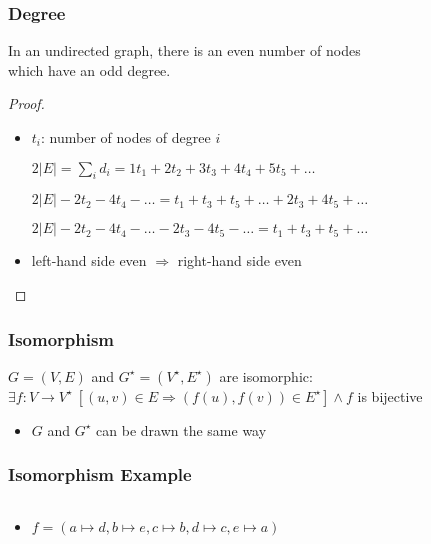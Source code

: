 \documentclass[dvipsnames]{beamer}
\begin{document}
\begin{frame}
  \frametitle{Degree}

  \begin{theorem}
    In an undirected graph, there is an even number of nodes\\
    which have an odd degree.
  \end{theorem}

  \pause
  \begin{proof}
    \begin{itemize}
      \item $t_i$: number of nodes of degree $i$

      \pause
$2|E| = \sum_i d_i = 1t_1 + 2t_2 + 3t_3 + 4t_4 + 5t_5 + \dots$

\pause
$2|E| - 2t_2 - 4t_4 - \dots = t_1 + t_3 + t_5 + \dots + 2t_3 + 4t_5 + \dots$

\pause
$2|E| - 2t_2 - 4t_4 - \dots - 2t_3 - 4t_5 - \dots = t_1 + t_3 + t_5 + \dots$

      \pause
      \item left-hand side even $\Rightarrow$ right-hand side even
    \end{itemize}
  \end{proof}
\end{frame}

\begin{frame}
  \frametitle{Isomorphism}

  \begin{definition}
    $G=(V,E)$ and $G^\star=(V^\star,E^\star)$ are \alert{isomorphic}:\\
      $\exists f: V \rightarrow V^\star~[(u,v) \in E \Rightarrow (f(u),f(v)) \in E^\star] \wedge
      f$ is bijective
  \end{definition}

  \pause
  \begin{itemize}
    \item $G$ and $G^\star$ can be drawn the same way
  \end{itemize}
\end{frame}

\begin{frame}
  \frametitle{Isomorphism Example}

  \begin{columns}
    \begin{center}
    \end{center}

    \begin{center}
    \end{center}
  \end{columns}

  \pause
  \bigskip
  \begin{itemize}
    \item $f = (a \mapsto d, b \mapsto e, c \mapsto b, d \mapsto c,
      e \mapsto a)$
  \end{itemize}
\end{frame}
\end{document}
